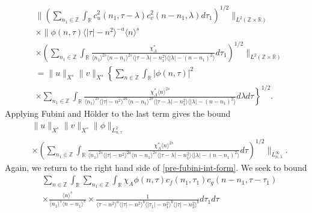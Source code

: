 \documentclass[12pt,reqno]{amsart}
\numberwithin{equation}{section}  %
\numberwithin{figure}{section}
\newcommand{\rr}{\mathbb{R}}
\newcommand{\zz}{\mathbb{Z}}
\theoremstyle{plain}
\theoremstyle{definition}
\theoremstyle{remark}
\begin{document}
%
%
\begin{equation*}
  \begin{split}
  & \|\left( \sum_{n_{1} \in \zz }\int_{\rr } c_{u}^{2}(n_1, \tau - \lambda)
  c_{v}^{2} (n - n_1, \lambda ) d \tau_1  \right)^{1/2} \|_{L^{2}(\zz \times
		\rr)}
		\\
    & \times  \|\phi(n, \tau) \langle | \tau | - n^{2} \rangle ^{-a} \langle n
    \rangle ^{s}
		\\
    & \times \left( \sum_{n_{1} \in \zz} \int_{\rr} \frac{\chi^{*}_{A}}{ \langle n_{1}
    \rangle ^{2s} \langle n-n_{1} \rangle ^{2s} \langle | \tau - \lambda|-n_{1}^{2}
    \rangle \langle  |\lambda | -(n - n_{1})^{2}
    \rangle } d \tau_1 \right)^{1/2} \|_{L^2(\zz \times \rr)}
		\\
    & = \|u\|_{X^{s}} \|v\|_{X^{s}} \label{holder-term*}
    \left \{ \sum_{n \in \zz} \int_{\rr} |\phi(n, \tau)|^{2} \right .
    \\
    & \left. \times \sum_{n_{1} \in \zz} \int_{\rr} \frac{\chi^{*}_{A}
    \langle n \rangle ^{2s}
    }{ \langle n_{1} \rangle^{2s} \langle | \tau | - n^{2}
    \rangle ^{2a}  \langle
n-n_{1} \rangle ^{2s}  \langle | \tau - \lambda|-n_{1}^{2}
\rangle \langle  | \lambda | -(n - n_{1})^{2}
    \rangle } d \lambda d \tau \right \}^{1/2}.
  \end{split}
\end{equation*}
%
%
Applying Fubini and H{\"o}lder to the last term gives the bound
%
%
\begin{equation}
  \label{integral-bound-1st-form-per*}
	\begin{split}
    & \|u\|_{X^{s}} \|v\|_{X^{s}} \| \phi \|_{L^{2}_{n, \tau}}
    \\
    & \times \left( \sum_{n_{1} \in \zz} \int_{\rr} \frac{\chi^{*}_{A}
    \langle n \rangle ^{2s}
    }{ \langle n_{1} \rangle^{2s} \langle | \tau | - n^{2}
    \rangle ^{2a}  \langle
n-n_{1} \rangle ^{2s}  \langle | \tau - \lambda|-n_{1}^{2}
\rangle \langle  | \lambda | -(n - n_{1})^{2}
    \rangle } d \tau  \right)^{1/2} \|_{L^\infty_{n, \lambda}}.
	\end{split}
\end{equation}
Again, we return to the right hand side of \eqref{pre-fubini-int-form}.
We seek to bound
\begin{equation*}
\begin{split}
  & \sum_{n \in \zz} \int_{\rr}  \sum_{n_{1} \in \zz }
  \int_{\rr} \chi_{A} \phi(n, \tau)
    c_f(n_1, \tau_1)
		c_g(n - n_1, \tau - \tau_1 )
		\\
    & \times \frac{\langle n \rangle ^{s}}{\langle n_{1} \rangle ^{s} \langle
    n-n_{1} \rangle ^{s}} \times \frac{1}{ \langle \tau - n^{2} \rangle^{a}
\langle |\tau| - n^{2} \rangle
    ^{b}\langle |\tau_{1}|-n_{1}^{2} \rangle ^{b}\langle | \tau|-n_{2}^{2}
    \rangle ^{b}} d \tau_1 d \tau 
   \end{split}
\end{equation*}
\end{document}
